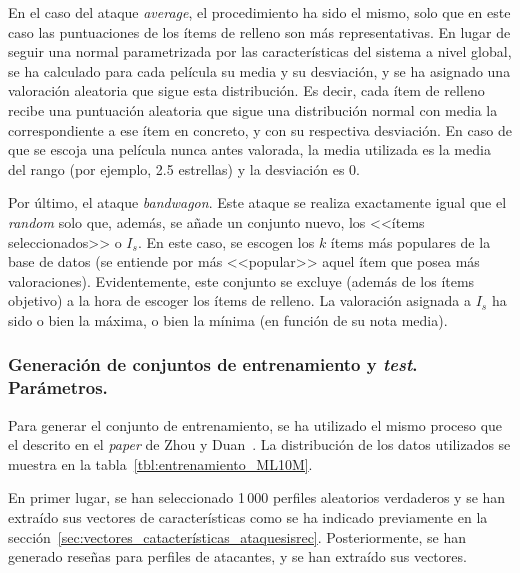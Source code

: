 En el caso del ataque \textit{average}, el procedimiento ha sido el mismo, solo que en este caso las puntuaciones de los ítems de relleno son más representativas. En lugar de seguir una normal parametrizada por las características del sistema a nivel global, se ha calculado para cada película su media y su desviación, y se ha asignado una valoración aleatoria que sigue esta distribución. Es decir, cada ítem de relleno recibe una puntuación aleatoria que sigue una distribución normal con media la correspondiente a ese ítem en concreto, y con su respectiva desviación. En caso de que se escoja una película nunca antes valorada, la media utilizada es la media del rango (por ejemplo, 2.5 estrellas) y la desviación es $0$.

Por último, el ataque \textit{bandwagon}. Este ataque se realiza exactamente igual que el \textit{random} solo que, además, se añade un conjunto nuevo, los <<ítems seleccionados>> o $I_s$. En este caso, se escogen los $k$ ítems más populares de la base de datos (se entiende por más <<popular>> aquel ítem que posea más valoraciones). Evidentemente, este conjunto se excluye (además de los ítems objetivo) a la hora de escoger los ítems de relleno. La valoración asignada a $I_s$ ha sido o bien la máxima, o bien la mínima (en función de su nota media).

\subsubsection{Generación de conjuntos de entrenamiento y \textit{test}. Parámetros.}

Para generar el conjunto de entrenamiento, se ha utilizado el mismo proceso que el descrito en el \textit{paper} de Zhou y Duan~\cite{zhou2021SemisupervisedRecommendationAttack}. La distribución de los datos utilizados se muestra en la tabla~\ref{tbl:entrenamiento_ML10M}.

En primer lugar, se han seleccionado 1\,000 perfiles aleatorios verdaderos y se han extraído sus vectores de características como se ha indicado previamente en la sección~\ref{sec:vectores_catacterísticas_ataquesisrec}. Posteriormente, se han generado reseñas para perfiles de atacantes, y se han extraído sus vectores.

